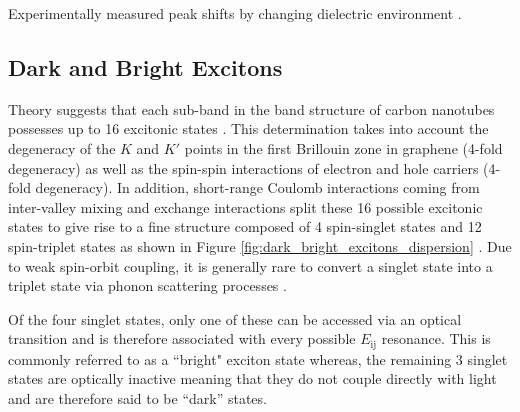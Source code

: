 Experimentally measured peak shifts by changing dielectric environment \cite{ohno2007excitonic}.

\subsection{Dark and Bright Excitons}

Theory suggests that each sub-band in the band structure of carbon nanotubes possesses up to 16 excitonic states \cite{amori2018excitons}. This determination takes into account the degeneracy of the $K$ and $K'$ points in the first Brillouin zone in graphene (4-fold degeneracy) as well as the spin-spin interactions of electron and hole carriers (4-fold degeneracy). In addition, short-range Coulomb interactions coming from inter-valley mixing and exchange interactions split these 16 possible excitonic states to give rise to a fine structure composed of 4 spin-singlet states and 12 spin-triplet states as shown in Figure \ref{fig:dark_bright_excitons_dispersion} \cite{ando2006effects}. Due to weak spin-orbit coupling, it is generally rare to convert a singlet state into a triplet state via phonon scattering processes \cite{amori2018excitons}.

Of the four singlet states, only one of these can be accessed via an optical transition and is therefore associated with every possible $E_\text{ij}$ resonance. This is commonly referred to as a ``bright" exciton state whereas, the remaining 3 singlet states are optically inactive meaning that they do not couple directly with light and are therefore said to be ``dark'' states.

